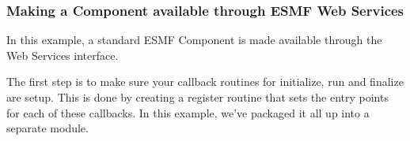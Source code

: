  
\setlength{\oldparskip}{\parskip}
\setlength{\parskip}{1.5ex}
\setlength{\oldparindent}{\parindent}
\setlength{\parindent}{0pt}
\setlength{\oldbaselineskip}{\baselineskip}
\setlength{\baselineskip}{11pt}
 
\def\bv{\begin{verbatim}}
\def\ev{\end{verbatim}}
\def\be{\begin{equation}}
\def\ee{\end{equation}}
\def\bea{\begin{eqnarray}}
\def\eea{\end{eqnarray}}
\def\bi{\begin{itemize}}
\def\ei{\end{itemize}}
\def\bn{\begin{enumerate}}
\def\en{\end{enumerate}}
\def\bd{\begin{description}}
\def\ed{\end{description}}
\def\({\left (}
\def\){\right )}
\def\[{\left [}
\def\]{\right ]}
\def\<{\left  \langle}
\def\>{\right \rangle}
\def\cI{{\cal I}}
\def\diag{\mathop{\rm diag}}
\def\tr{\mathop{\rm tr}}


 

  \subsubsection{Making a Component available through ESMF Web Services}
        
    In this example, a standard ESMF Component is made available through
    the Web Services interface. 

    The first step is to make sure your callback routines for initialize, run
    and finalize are setup.  This is done by creating a register routine that
    sets the entry points for each of these callbacks.  In this example, we've
    packaged it all up into a separate module.   

